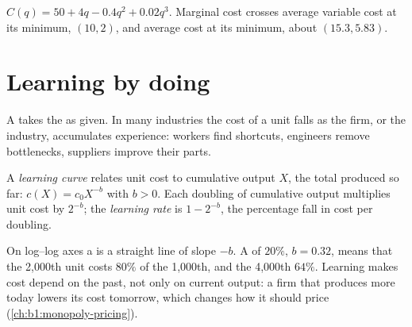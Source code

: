 \begin{omfigure}

{\small $C(q) = 50 + 4q - 0.4q^2 + 0.02q^3$. Marginal cost crosses average variable
cost at its minimum, $(10, 2)$, and average cost at its minimum, about
$(15.3, 5.83)$.}
\end{omfigure}

\section{Learning by doing}\label{sec:b1:cost-minimisation:learning}

A  takes the  as given. In many
industries the cost of a unit falls as the firm, or the industry,
accumulates experience: workers find shortcuts, engineers remove
bottlenecks, suppliers improve their parts.

\begin{definition}\label{def:b1:cost-minimisation:learning-curve}
A \emph{learning curve} relates unit cost to cumulative output $X$, the
total produced so far: $c(X) = c_0X^{-b}$ with $b > 0$. Each doubling of
cumulative output multiplies unit cost by $2^{-b}$; the \emph{learning rate}
is $1 - 2^{-b}$, the percentage fall in cost per doubling.
\end{definition}

On log--log axes a  is a straight line of slope $-b$. A
 of $20\%$, $b = 0.32$, means that the 2,000th unit costs $80\%$ of
the 1,000th, and the 4,000th $64\%$. Learning makes cost depend on the past,
not only on current output: a firm that produces more today lowers its cost
tomorrow, which changes how it should price (\cref{ch:b1:monopoly-pricing}).

